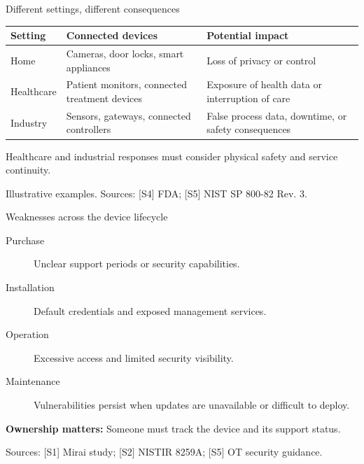 \documentclass[aspectratio=169,12pt]{beamer}
\newcommand{\source}[1]{\par\vfill{\fontsize{6.5}{7.5}\selectfont\color{Muted}#1\par}}
\newcommand{\gap}{\par\vspace{2mm}}
\begin{document}
\begin{frame}{Different settings, different consequences}
\small
\renewcommand{\arraystretch}{1.25}
\begin{tabularx}{\linewidth}{@{}p{22mm}YY@{}}
\toprule
\textbf{Setting} & \textbf{Connected devices} & \textbf{Potential impact}\\
\midrule
Home & Cameras, door locks, smart appliances
& Loss of privacy or control\\
Healthcare & Patient monitors, connected treatment devices
& Exposure of health data or interruption of care\\
Industry & Sensors, gateways, connected controllers
& False process data, downtime, or safety consequences\\
\bottomrule
\end{tabularx}
\gap
\normalsize
Healthcare and industrial responses must consider physical safety
and service continuity.
\source{Illustrative examples. Sources: [S4] FDA; [S5] NIST SP 800-82 Rev. 3.}
\end{frame}

\begin{frame}{Weaknesses across the device lifecycle}
\begin{description}
\item[Purchase] Unclear support periods or security capabilities.
\item[Installation] Default credentials and exposed management services.
\item[Operation] Excessive access and limited security visibility.
\item[Maintenance] Vulnerabilities persist when updates are unavailable
or difficult to deploy.
\end{description}
\gap
\textbf{Ownership matters:} Someone must track the device and its support status.
\source{Sources: [S1] Mirai study; [S2] NISTIR 8259A; [S5] OT security guidance.}
\end{frame}
\end{document}
